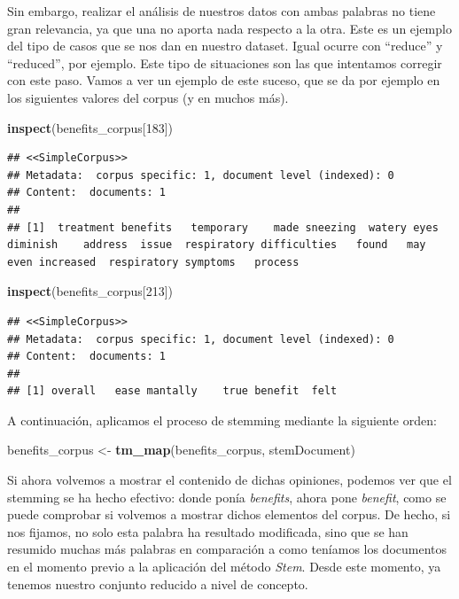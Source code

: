 \documentclass[spanish,]{article}
\newenvironment{Shaded}{\begin{snugshade}}{\end{snugshade}}
\newcommand{\KeywordTok}[1]{\textcolor[rgb]{0.13,0.29,0.53}{\textbf{#1}}}
\newcommand{\DecValTok}[1]{\textcolor[rgb]{0.00,0.00,0.81}{#1}}
\newcommand{\StringTok}[1]{\textcolor[rgb]{0.31,0.60,0.02}{#1}}
\newcommand{\NormalTok}[1]{#1}
\begin{document}
Sin embargo, realizar el análisis de nuestros datos con ambas palabras
no tiene gran relevancia, ya que una no aporta nada respecto a la otra.
Este es un ejemplo del tipo de casos que se nos dan en nuestro dataset.
Igual ocurre con ``reduce'' y ``reduced'', por ejemplo. Este tipo de
situaciones son las que intentamos corregir con este paso. Vamos a ver
un ejemplo de este suceso, que se da por ejemplo en los siguientes
valores del corpus (y en muchos más).

\begin{Shaded}
\begin{Highlighting}[]
\KeywordTok{inspect}\NormalTok{(benefits_corpus[}\DecValTok{183}\NormalTok{])}
\end{Highlighting}
\end{Shaded}

\begin{verbatim}
## <<SimpleCorpus>>
## Metadata:  corpus specific: 1, document level (indexed): 0
## Content:  documents: 1
## 
## [1]  treatment benefits   temporary    made sneezing  watery eyes diminish    address  issue  respiratory difficulties   found   may  even increased  respiratory symptoms   process
\end{verbatim}

\begin{Shaded}
\begin{Highlighting}[]
\KeywordTok{inspect}\NormalTok{(benefits_corpus[}\DecValTok{213}\NormalTok{])}
\end{Highlighting}
\end{Shaded}

\begin{verbatim}
## <<SimpleCorpus>>
## Metadata:  corpus specific: 1, document level (indexed): 0
## Content:  documents: 1
## 
## [1] overall   ease mantally    true benefit  felt
\end{verbatim}

A continuación, aplicamos el proceso de stemming mediante la siguiente
orden:

\begin{Shaded}
\begin{Highlighting}[]
\NormalTok{benefits_corpus <-}\StringTok{ }\KeywordTok{tm_map}\NormalTok{(benefits_corpus, stemDocument)}
\end{Highlighting}
\end{Shaded}

Si ahora volvemos a mostrar el contenido de dichas opiniones, podemos
ver que el stemming se ha hecho efectivo: donde ponía \textit{benefits},
ahora pone \textit{benefit}, como se puede comprobar si volvemos a
mostrar dichos elementos del corpus. De hecho, si nos fijamos, no solo
esta palabra ha resultado modificada, sino que se han resumido muchas
más palabras en comparación a como teníamos los documentos en el momento
previo a la aplicación del método \textit{Stem}. Desde este momento, ya
tenemos nuestro conjunto reducido a nivel de concepto.
\end{document}
